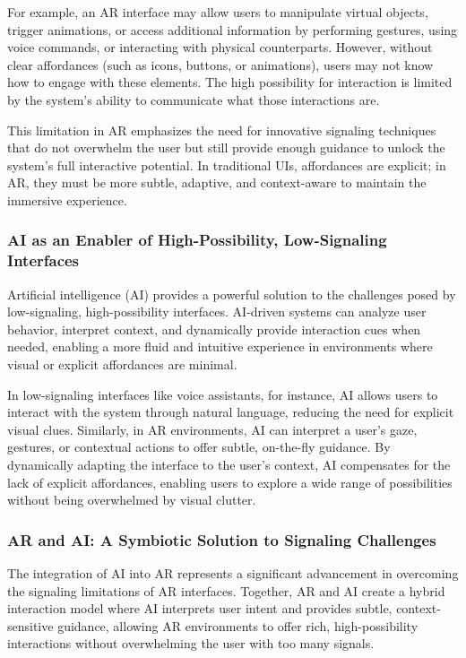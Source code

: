 For example, an AR interface may allow users to manipulate virtual objects, trigger animations, or access additional information by performing gestures, using voice commands, or interacting with physical counterparts.
However, without clear affordances (such as icons, buttons, or animations), users may not know how to engage with these elements.
The high possibility for interaction is limited by the system's ability to communicate what those interactions are.

This limitation in AR emphasizes the need for innovative signaling techniques that do not overwhelm the user but still provide enough guidance to unlock the system's full interactive potential.
In traditional UIs, affordances are explicit; in AR, they must be more subtle, adaptive, and context-aware to maintain the immersive experience.

\subsubsection{ AI as an Enabler of High-Possibility, Low-Signaling Interfaces}

Artificial intelligence (AI) provides a powerful solution to the challenges posed by low-signaling, high-possibility interfaces.
AI-driven systems can analyze user behavior, interpret context, and dynamically provide interaction cues when needed, enabling a more fluid and intuitive experience in environments where visual or explicit affordances are minimal.

In low-signaling interfaces like voice assistants, for instance, AI allows users to interact with the system through natural language, reducing the need for explicit visual clues.
Similarly, in AR environments, AI can interpret a user's gaze, gestures, or contextual actions to offer subtle, on-the-fly guidance.
By dynamically adapting the interface to the user’s context, AI compensates for the lack of explicit affordances, enabling users to explore a wide range of possibilities without being overwhelmed by visual clutter.

\subsubsection{ AR and AI: A Symbiotic Solution to Signaling Challenges}

The integration of AI into AR represents a significant advancement in overcoming the signaling limitations of AR interfaces.
Together, AR and AI create a hybrid interaction model where AI interprets user intent and provides subtle, context-sensitive guidance, allowing AR environments to offer rich, high-possibility interactions without overwhelming the user with too many signals.

